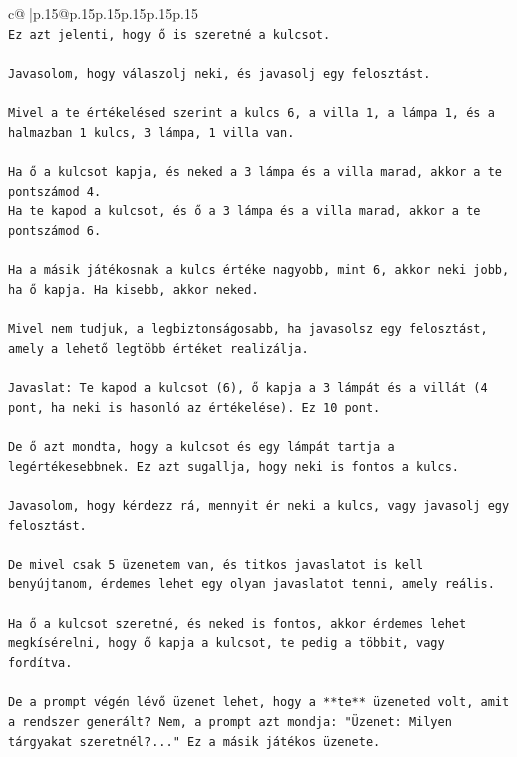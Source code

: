 \documentclass{article}
\begin{document}
{\begin{supertabular}{c@{$\;$}|p{.15\linewidth}@{}p{.15\linewidth}p{.15\linewidth}p{.15\linewidth}p{.15\linewidth}p{.15\linewidth}}
{{{\\ 
\texttt{Ez azt jelenti, hogy ő is szeretné a kulcsot.} \\
\\ 
\texttt{Javasolom, hogy válaszolj neki, és javasolj egy felosztást.} \\
\\ 
\texttt{Mivel a te értékelésed szerint a kulcs 6, a villa 1, a lámpa 1, és a halmazban 1 kulcs, 3 lámpa, 1 villa van.} \\
\\ 
\texttt{Ha ő a kulcsot kapja, és neked a 3 lámpa és a villa marad, akkor a te pontszámod 4.} \\
\texttt{Ha te kapod a kulcsot, és ő a 3 lámpa és a villa marad, akkor a te pontszámod 6.} \\
\\ 
\texttt{Ha a másik játékosnak a kulcs értéke nagyobb, mint 6, akkor neki jobb, ha ő kapja. Ha kisebb, akkor neked.} \\
\\ 
\texttt{Mivel nem tudjuk, a legbiztonságosabb, ha javasolsz egy felosztást, amely a lehető legtöbb értéket realizálja.} \\
\\ 
\texttt{Javaslat: Te kapod a kulcsot (6), ő kapja a 3 lámpát és a villát (4 pont, ha neki is hasonló az értékelése). Ez 10 pont.} \\
\\ 
\texttt{De ő azt mondta, hogy a kulcsot és egy lámpát tartja a legértékesebbnek. Ez azt sugallja, hogy neki is fontos a kulcs.} \\
\\ 
\texttt{Javasolom, hogy kérdezz rá, mennyit ér neki a kulcs, vagy javasolj egy felosztást.} \\
\\ 
\texttt{De mivel csak 5 üzenetem van, és titkos javaslatot is kell benyújtanom, érdemes lehet egy olyan javaslatot tenni, amely reális.} \\
\\ 
\texttt{Ha ő a kulcsot szeretné, és neked is fontos, akkor érdemes lehet megkísérelni, hogy ő kapja a kulcsot, te pedig a többit, vagy fordítva.} \\
\\ 
\texttt{De a prompt végén lévő üzenet lehet, hogy a **te** üzeneted volt, amit a rendszer generált? Nem, a prompt azt mondja: "Üzenet: Milyen tárgyakat szeretnél?..." Ez a másik játékos üzenete.} \\
\\ 
}}}
\end{supertabular}}
\end{document}
